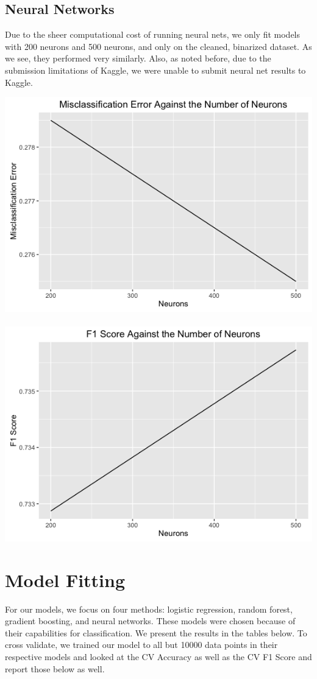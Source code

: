 \documentclass{article}
\begin{document}
\subsection{Neural Networks}
Due to the sheer computational cost of running neural nets, we only fit models with 200 neurons and 500 neurons, and only on the cleaned, binarized dataset. As we see, they performed very similarly. Also, as noted before, due to the submission limitations of Kaggle, we were unable to submit neural net results to Kaggle. \\

\centerline{\includegraphics[scale=.35]{diagrams/8nn.png} ~~~~~~~~~~ \includegraphics[scale=.35]{diagrams/9nn.png}}

\section{Model Fitting}
For our models, we focus on four methods: logistic regression, random forest, gradient boosting, and neural networks. These models were chosen because of their capabilities for classification. We present the results in the tables below. To cross validate, we trained our model to all but 10000 data points in their respective models and looked at the CV Accuracy as well as the CV F1 Score and report those below as well.
\end{document}
